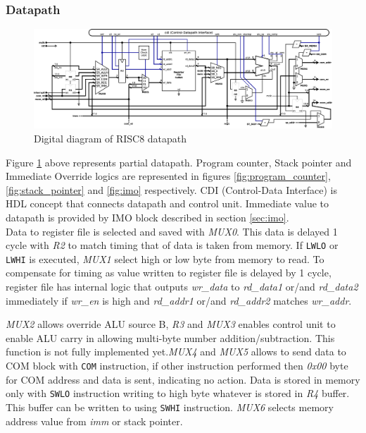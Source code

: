 \documentclass[a4paper,12pt]{article}
\begin{document}
\begin{landscape}
\subsubsection{Datapath} \label{sec:datapath}
\begin{figure}[h!]
	\centering
	\includegraphics[width=\linewidth]{graphics/datapath.eps}
	\caption{Digital diagram of RISC8 datapath}
	\label{fig:datapath}	
\end{figure}

Figure \ref{fig:datapath} above represents partial datapath. Program counter, Stack pointer and Immediate Override logics are represented in figures \ref{fig:program_counter}, \ref{fig:stack_pointer} and \ref{fig:imo} respectively. CDI (Control-Data Interface) is HDL concept that connects datapath and control unit. Immediate value to datapath is provided by IMO block described in section \ref{sec:imo}.\\
Data to register file is selected and saved with \textit{MUX0}. This data is delayed 1 cycle with \textit{R2} to match timing that of data is taken from memory. If \texttt{LWLO} or \texttt{LWHI} is executed, \textit{MUX1} select high or low byte from memory to read. To compensate for timing as value written to register file is delayed by 1 cycle, register file has internal logic that outputs \textit{wr\_data} to \textit{rd\_data1} or/and  \textit{rd\_data2} immediately if \textit{wr\_en} is high and \textit{rd\_addr1} or/and \textit{rd\_addr2} matches \textit{wr\_addr}.\\
\end{landscape}
\textit{MUX2} allows override ALU source B, \textit{R3} and \textit{MUX3} enables control unit to enable ALU carry in allowing multi-byte number addition/subtraction. This function is not fully implemented yet.\textit{MUX4} and \textit{MUX5} allows to send data to COM block with \texttt{COM} instruction, if other instruction performed then \textit{0x00} byte for COM address and data is sent, indicating no action. Data is stored in memory only with \texttt{SWLO} instruction writing to high byte whatever is stored in \textit{R4} buffer. This buffer can be written to using \texttt{SWHI} instruction. \textit{MUX6} selects memory address value from \textit{imm} or stack pointer.
\end{document}
